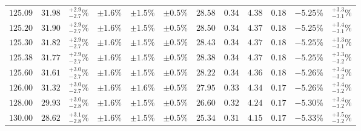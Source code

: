 \begin{landscape}
\begin{table}[ht!]
{\begin{tabular}{| cc | c | ccc | ccccc | c |}
$125.09$ & $31.98$ & $^{+2.9}_{-2.7}\%$ & $\pm 1.6\%$ & {\color{black!55}$\pm 1.5\%$} & {\color{black!55}$\pm 0.5\%$} & $28.58$ & $0.34$ & $4.38$ & $0.18$ & $-5.25\%$ & $^{+3.3}_{-3.1}\%$ \\
$125.20$ & $31.90$ & $^{+2.9}_{-2.7}\%$ & $\pm 1.6\%$ & {\color{black!55}$\pm 1.5\%$} & {\color{black!55}$\pm 0.5\%$} & $28.50$ & $0.34$ & $4.37$ & $0.18$ & $-5.25\%$ & $^{+3.4}_{-3.1}\%$ \\
$125.30$ & $31.82$ & $^{+2.9}_{-2.7}\%$ & $\pm 1.6\%$ & {\color{black!55}$\pm 1.5\%$} & {\color{black!55}$\pm 0.5\%$} & $28.43$ & $0.34$ & $4.37$ & $0.18$ & $-5.25\%$ & $^{+3.3}_{-3.1}\%$ \\
$125.38$ & $31.77$ & $^{+2.9}_{-2.7}\%$ & $\pm 1.6\%$ & {\color{black!55}$\pm 1.5\%$} & {\color{black!55}$\pm 0.5\%$} & $28.38$ & $0.34$ & $4.37$ & $0.18$ & $-5.25\%$ & $^{+3.3}_{-3.2}\%$ \\
$125.60$ & $31.61$ & $^{+3.0}_{-2.7}\%$ & $\pm 1.6\%$ & {\color{black!55}$\pm 1.5\%$} & {\color{black!55}$\pm 0.5\%$} & $28.22$ & $0.34$ & $4.36$ & $0.18$ & $-5.26\%$ & $^{+3.4}_{-3.2}\%$ \\
$126.00$ & $31.32$ & $^{+3.0}_{-2.7}\%$ & $\pm 1.6\%$ & {\color{black!55}$\pm 1.6\%$} & {\color{black!55}$\pm 0.5\%$} & $27.95$ & $0.33$ & $4.34$ & $0.17$ & $-5.26\%$ & $^{+3.4}_{-3.2}\%$ \\
$128.00$ & $29.93$ & $^{+3.0}_{-2.8}\%$ & $\pm 1.6\%$ & {\color{black!55}$\pm 1.5\%$} & {\color{black!55}$\pm 0.5\%$} & $26.60$ & $0.32$ & $4.24$ & $0.17$ & $-5.30\%$ & $^{+3.4}_{-3.2}\%$ \\
$130.00$ & $28.62$ & $^{+3.1}_{-2.8}\%$ & $\pm 1.6\%$ & {\color{black!55}$\pm 1.5\%$} & {\color{black!55}$\pm 0.5\%$} & $25.34$ & $0.31$ & $4.15$ & $0.17$ & $-5.33\%$ & $^{+3.5}_{-3.2}\%$ \\
\cline{1-12}
\end{tabular}
}
\end{table}



\end{landscape}

